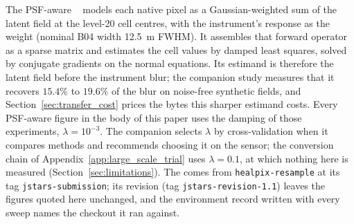 The PSF-aware ~\cite{delouis2026resample} models each
native pixel as a Gaussian-weighted sum of the latent field at the
level-20 cell centres, with the instrument's response as the weight
(nominal B04 width \SI{12.5}{m} FWHM). It assembles that forward operator
as a sparse matrix and estimates the cell values by damped least
squares, solved by conjugate gradients on the normal equations. Its
estimand is therefore the latent field before the instrument blur; the
companion study measures that it recovers $15.4\%$ to $19.6\%$ of the
blur on noise-free synthetic fields, and Section~\ref{sec:transfer_cost}
prices the bytes this sharper estimand costs. Every PSF-aware figure in
the body of this paper uses the damping of those experiments,
$\lambda=10^{-3}$. The companion selects $\lambda$ by cross-validation
when it compares methods and recommends choosing it on the 
sensor; the conversion chain of Appendix~\ref{app:large_scale_trial}
uses $\lambda=0.1$, at which nothing here is measured
(Section~\ref{sec:limitations}). The  comes from
\texttt{healpix-resample} at its tag \texttt{jstars-submission}; its
revision (tag \texttt{jstars-revision-1.1}) leaves the figures quoted
here unchanged, and the environment record written with every sweep
names the checkout it ran against.

